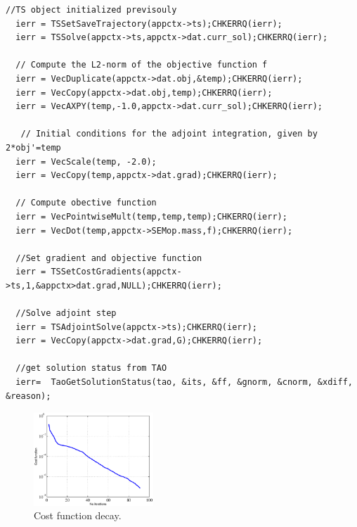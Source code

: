 \documentclass[10pt]{article}
\begin{document}
{\begin{lstlisting}[caption=PETSc code for PDE constrained optimization via adjoints, label=codemat]
  //TS object initialized previsouly
  ierr = TSSetSaveTrajectory(appctx->ts);CHKERRQ(ierr);
  ierr = TSSolve(appctx->ts,appctx->dat.curr_sol);CHKERRQ(ierr);
  
  // Compute the L2-norm of the objective function f
  ierr = VecDuplicate(appctx->dat.obj,&temp);CHKERRQ(ierr);
  ierr = VecCopy(appctx->dat.obj,temp);CHKERRQ(ierr);
  ierr = VecAXPY(temp,-1.0,appctx->dat.curr_sol);CHKERRQ(ierr);
  
   // Initial conditions for the adjoint integration, given by 2*obj'=temp    
  ierr = VecScale(temp, -2.0);
  ierr = VecCopy(temp,appctx->dat.grad);CHKERRQ(ierr);
  
  // Compute obective function
  ierr = VecPointwiseMult(temp,temp,temp);CHKERRQ(ierr);
  ierr = VecDot(temp,appctx->SEMop.mass,f);CHKERRQ(ierr);
  
  //Set gradient and objective function
  ierr = TSSetCostGradients(appctx->ts,1,&appctx>dat.grad,NULL);CHKERRQ(ierr);
       
  //Solve adjoint step
  ierr = TSAdjointSolve(appctx->ts);CHKERRQ(ierr);
  ierr = VecCopy(appctx->dat.grad,G);CHKERRQ(ierr);
  
  //get solution status from TAO
  ierr=  TaoGetSolutionStatus(tao, &its, &ff, &gnorm, &cnorm, &xdiff, &reason);
\end{lstlisting}
\begin{figure}[!ht]
\centering
\includegraphics[width=0.4\textwidth]{Cost_decay.eps}
\caption{Cost function decay.}
\label{fig:decay_cd}
\end{figure}

}
\end{document}
